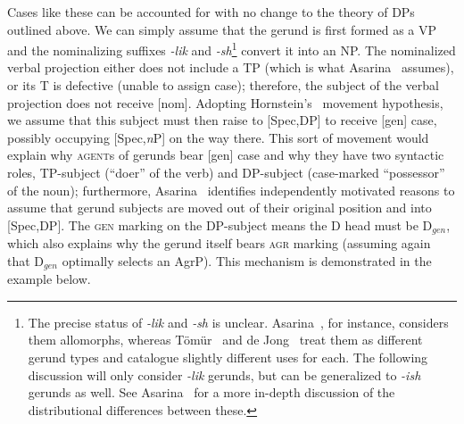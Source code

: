 \documentclass[letterpaper,12pt]{article}
\newcommand{\posst}{\textsc{agr}}
\newcommand{\gen}{\textsc{gen}}
\begin{document}
Cases like these can be accounted for with no change to the theory of DPs outlined above. We can simply assume that the gerund is first formed as a VP and the 
nominalizing suffixes \textsl{-lik} and \textsl{-sh}\footnote{The precise status of \textsl{-lik} and \textsl{-sh} is unclear. Asarina~\citeyear[p. 11]{Asarina}, for instance, considers them allomorphs, whereas T\"om\"ur~\citeyear{Tomur} and de Jong~\citeyear{deJong} treat them as different gerund types and catalogue slightly
different uses for each. The following discussion will only consider \textsl{-lik} gerunds, but can be generalized to \textsl{-ish} gerunds as well. See
Asarina~\citeyear{Asarina2010,Asarina} for a more in-depth discussion of the distributional differences between these.} convert it into an NP. The nominalized verbal projection either does not include a TP (which
is what Asarina~\citeyear{Asarina} assumes), or
its T is defective (unable to assign case); therefore, the subject of the verbal projection does not receive [nom]. Adopting Hornstein's~\citeyear{Hornstein} movement hypothesis, we assume that this subject must then raise to [Spec,DP] to receive [gen] case, possibly occupying [Spec,\textit{n}P] on the way there. This
sort of movement
would explain why \textsc{agent}s of gerunds bear [gen] case and why they have two syntactic roles, TP-subject (``doer'' of the verb) and DP-subject (case-marked ``possessor'' of the noun); furthermore, Asarina~\citeyear{Asarina} identifies independently motivated reasons to assume that gerund subjects are moved out of
their original position and into [Spec,DP]. The \gen{} marking on the DP-subject means the D head must be D$_{gen}$, which also explains why the gerund itself bears \posst{} marking (assuming again that D$_{gen}$ optimally selects an AgrP). This mechanism is demonstrated in the example below.
\end{document}

